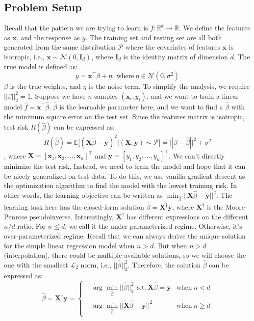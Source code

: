 \documentclass{article}
\begin{document}
\subsection{Problem Setup} \label{problem}
Recall that the pattern we are trying to learn is $f: \mathbb{R}^d \to \mathbb{R}$. We define the features as $\mathbf{x}$, and the response as $y$. The training set and testing set are all both generated from the same distribution $\mathcal{P}$ where the covariates of features $\mathbf{x}$ is isotropic, i.e., $\mathbf{x} \sim \mathcal{N}(0, \mathbf{I}_d)$, where $\mathbf{I}_d$ is the identity matrix of dimension $d$. The true model is defined as:
\begin{equation}
	y = \mathbf{x}^\intercal \beta + \eta, \ \text{where} \ \eta \in \mathcal{N}(0, \sigma^2)
\end{equation}
$\beta$ is the true weights, and $\eta$ is the noise term. To simplify the analysis, we require $||\beta||_2^2 = 1$. Suppose we have $n$ samples $(\mathbf{x}_i, y_i)$, and we want to train a linear model $\hat{f} = \mathbf{x}^\intercal \hat{\beta}$. $\hat{\beta}$ is the learnable parameter here, and we want to find a $\hat{\beta}$ with the minimum square error on the test set. Since the features matrix is isotropic, test risk $R(\hat{\beta})$ can be expressed as:
\begin{equation}
	R(\hat{\beta}) = \mathbb{E}[(\mathbf{X} \hat{\beta} - \mathbf{y})^2|(\mathbf{X}, \mathbf{y}) \sim \mathcal{P}] = ||\beta - \hat{\beta}||^2 + \sigma^2
\end{equation} 
, where $\mathbf{X} = [\mathbf{x}_1, \mathbf{x}_2, ..., \mathbf{x}_n]^\intercal$ and $\mathbf{y} = [y_1, y_2, ..., y_n]^\intercal$. We can't directly minimize the test risk. Instead, we need to train the model and hope that it can be nicely generalized on test data. To do this, we use vanilla gradient descent as the optimization algorithm to find the model with the lowest training risk. In other words, the learning objective can be written as $\min_{\hat{\beta}} ||\mathbf{X} \hat{\beta} - \mathbf{y}||^2$. The learning task here has the closed-form solution $\hat{\beta} = \mathbf{X}^\dagger\mathbf{y}$, where $\mathbf{X}^\dagger$ is the Moore-Penrose pseudoinverse. Interestingly, $\mathbf{X}^\dagger$ has different expressions on the different $n/d$ ratio. For $n \leq d$, we call it the under-parameterized regime. Otherwise, it's over-parameterized regime. Recall that we can always derive the unique solution for the simple linear regression model when $n > d$. But when $n > d$ (interpolation), there could be multiple available solutions, so we will choose the one with the smallest $\mathcal{L}_2$ norm, i.e., $||\hat{\beta}||_2^2$. Therefore, the solution $\hat{\beta}$ can be expressed as:
\begin{equation}
	\hat{\beta} = \mathbf{X}^\dagger \mathbf{y} = \left\{
	\begin{aligned}
		& \arg\min_{\hat{\beta}}||\hat{\beta}||_2^2 \ \ \text{s.t.} \ \mathbf{X}\hat{\beta} = \mathbf{y} & \text{when} \ n < d\\
		& \arg\min_{\hat{\beta}}||\mathbf{X}\hat{\beta} - \mathbf{y}||^2 & \text{when} \ n \geq d
	\end{aligned}
	\right.
\end{equation}
\end{document}
